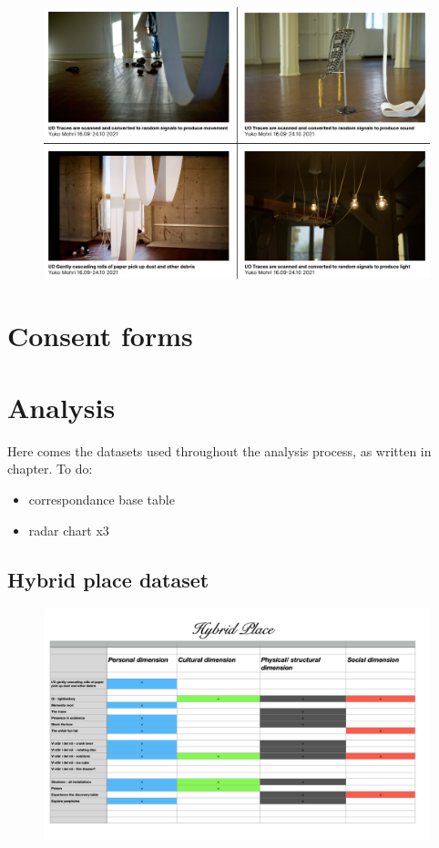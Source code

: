 \begin{figure}[H]
\includegraphics[width=13cm]{pictures/dataset/yuko_mohri.png}
\centering 
\end{figure}

\section{Consent forms}

\section{Analysis}
Here comes the datasets used throughout the analysis process, as written in chapter. To do:

\begin{itemize}
    \item correspondance base table
    \item radar chart x3
\end{itemize}


\subsection{Hybrid place dataset}
\begin{figure}[H]
\includegraphics[width=13cm]{pictures/appendix/table_hybridplace.png}
\centering 
\end{figure}


